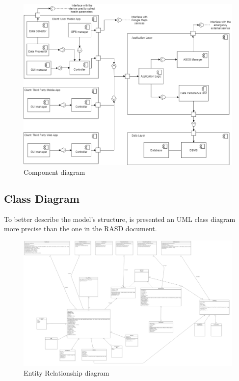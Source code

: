 \begin{figure}[h!]
	\includegraphics[width=1.0\textwidth]{./pictures/component_diagram.png}\par
	\caption{Component diagram}
\end{figure}
\FloatBarrier

\subsection{Class Diagram}
To better describe the model's structure, is presented an UML class diagram more precise than the one in the RASD document. \\

\begin{figure}[h!]
	\includegraphics[width=1.0\textwidth]{./pictures/class_diagram.png}\par
	\caption{Entity Relationship diagram}
\end{figure}

